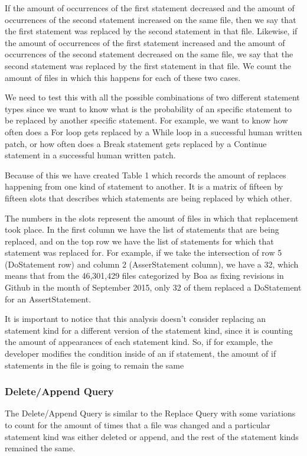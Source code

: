 \documentclass{sig-alternate-05-2015}
\begin{document}
If the amount of occurrences of the first statement decreased and the amount of occurrences  of the second statement increased on the same file, then we say that the first statement was replaced by the second statement in that file. Likewise, if the amount of occurrences of the first statement increased and the amount of occurrences  of the second statement decreased on the same file, we say that the second statement was replaced by the first statement in that file. We count the amount of files in which this happens for each of these two cases.

We need to test this with all the possible combinations of two different statement types since we want to know what is the probability of an specific statement to be replaced by another specific statement. For example, we want to know how often does a For loop gets replaced by a While loop in a successful human written patch, or how often does a Break statement gets replaced by a Continue statement in a successful human written patch.

Because of this we have created Table 1 which records the amount of replaces happening from one kind of statement to another. It is a matrix of fifteen by fifteen slots that describes which statements are being replaced by which other. 

The numbers in the slots represent the amount of files in which that replacement took place. In the first column we have the list of statements that are being replaced, and on the top row we have the list of statements for which that statement was replaced for. For example, if we take the intersection of row 5 (DoStatement row) and column 2 (AsserStatement column), we have a 32, which means that from the 46,301,429 files categorized by Boa as fixing revisions in Github in the month of September 2015, only 32 of them replaced a DoStatement for an AssertStatement.

It is important to notice  that this analysis doesn't consider replacing an statement kind for a different version of the statement kind, since it is counting the amount of appearances of each statement kind. So, if for example, the developer modifies the condition inside of an if statement, the amount of if statements in the file is going to remain the same

\subsubsection{Delete/Append Query}

The Delete/Append Query is similar to the Replace Query with some variations to count for the amount of times that a file was changed and a particular statement kind was either deleted or append, and the rest of the statement kinds remained the same.
\end{document}
